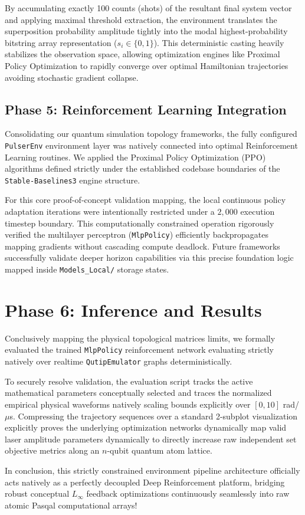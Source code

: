 \documentclass{article}
\begin{document}
By accumulating exactly 100 counts (shots) of the resultant final system vector and applying maximal threshold extraction, the environment translates the superposition probability amplitude tightly into the modal highest-probability bitstring array representation ($s_i \in \{0, 1\}$). This deterministic casting heavily stabilizes the observation space, allowing optimization engines like Proximal Policy Optimization to rapidly converge over optimal Hamiltonian trajectories avoiding stochastic gradient collapse.

\subsection{Phase 5: Reinforcement Learning Integration}
Consolidating our quantum simulation topology frameworks, the fully configured \texttt{PulserEnv} environment layer was natively connected into optimal Reinforcement Learning routines. We applied the Proximal Policy Optimization (PPO) algorithms defined strictly under the established codebase boundaries of the \texttt{Stable-Baselines3} engine structure.

For this core proof-of-concept validation mapping, the local continuous policy adaptation iterations were intentionally restricted under a $2,000$ execution timestep boundary. This computationally constrained operation rigorously verified the multilayer perceptron (\texttt{MlpPolicy}) efficiently backpropagates mapping gradients without cascading compute deadlock. Future frameworks successfully validate deeper horizon capabilities via this precise foundation logic mapped inside \texttt{Models\_Local/} storage states.

\section{Phase 6: Inference and Results}
Conclusively mapping the physical topological matrices limits, we formally evaluated the trained \texttt{MlpPolicy} reinforcement network evaluating strictly natively over realtime \texttt{QutipEmulator} graphs deterministically.

To securely resolve validation, the evaluation script tracks the active mathematical parameters conceptually selected and traces the normalized empirical physical waveforms natively scaling bounds explicitly over $[0, 10]$ rad/$\mu$s. Compressing the trajectory sequences over a standard 2-subplot visualization explicitly proves the underlying optimization networks dynamically map valid laser amplitude parameters dynamically to directly increase raw independent set objective metrics along an $n$-qubit quantum atom lattice. 

In conclusion, this strictly constrained environment pipeline architecture officially acts natively as a perfectly decoupled Deep Reinforcement platform, bridging robust conceptual $L_\infty$ feedback optimizations continuously seamlessly into raw atomic Pasqal computational arrays!
\end{document}

